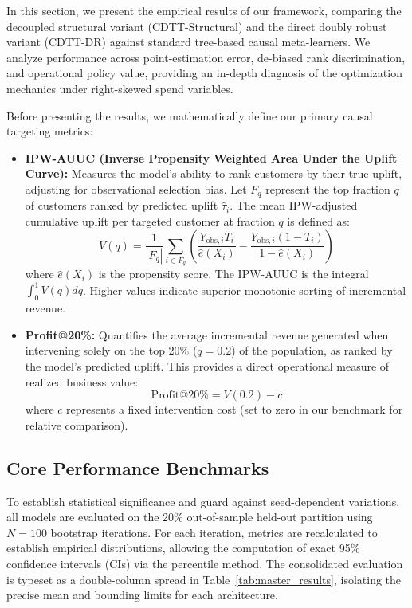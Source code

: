 \documentclass[10pt, conference]{IEEEtran}
\newcommand{\ourmodel}{CDTT}
\begin{document}
In this section, we present the empirical results of our framework, comparing the decoupled structural variant (\ourmodel-Structural) and the direct doubly robust variant (\ourmodel-DR) against standard tree-based causal meta-learners. We analyze performance across point-estimation error, de-biased rank discrimination, and operational policy value, providing an in-depth diagnosis of the optimization mechanics under right-skewed spend variables.

Before presenting the results, we mathematically define our primary causal targeting metrics:
\begin{itemize}
    \item \textbf{IPW-AUUC (Inverse Propensity Weighted Area Under the Uplift Curve):} Measures the model's ability to rank customers by their true uplift, adjusting for observational selection bias. Let $F_q$ represent the top fraction $q$ of customers ranked by predicted uplift $\hat{\tau}_i$. The mean IPW-adjusted cumulative uplift per targeted customer at fraction $q$ is defined as:
    \begin{equation}
    V(q) = \frac{1}{|F_q|} \sum_{i \in F_q} \left( \frac{Y_{\text{obs},i} T_i}{\hat{e}(X_i)} - \frac{Y_{\text{obs},i} (1-T_i)}{1-\hat{e}(X_i)} \right)
    \end{equation}
    where $\hat{e}(X_i)$ is the propensity score. The IPW-AUUC is the integral $\int_0^1 V(q) dq$. Higher values indicate superior monotonic sorting of incremental revenue.
    \item \textbf{Profit@20\%:} Quantifies the average incremental revenue generated when intervening solely on the top 20\% ($q=0.2$) of the population, as ranked by the model's predicted uplift. This provides a direct operational measure of realized business value:
    \begin{equation}
    \text{Profit@20\%} = V(0.2) - c
    \end{equation}
    where $c$ represents a fixed intervention cost (set to zero in our benchmark for relative comparison).
\end{itemize}

\subsection{Core Performance Benchmarks}
To establish statistical significance and guard against seed-dependent variations, all models are evaluated on the 20\% out-of-sample held-out partition using $N=100$ bootstrap iterations. For each iteration, metrics are recalculated to establish empirical distributions, allowing the computation of exact 95\% confidence intervals (CIs) via the percentile method. The consolidated evaluation is typeset as a double-column spread in Table~\ref{tab:master_results}, isolating the precise mean and bounding limits for each architecture.
\end{document}
